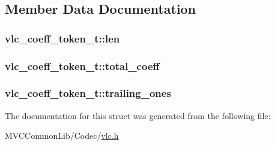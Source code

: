 \subsection{Member Data Documentation}
\hypertarget{structvlc__coeff__token__t_a44a0b097012b2c20f2c2da02dfe98e99}{
\subsubsection[{len}]{ {\bf vlc\_\-coeff\_\-token\_\-t::len}}}
\label{structvlc__coeff__token__t_a44a0b097012b2c20f2c2da02dfe98e99}
\hypertarget{structvlc__coeff__token__t_a8f1bc5c088694aeb2e4676a3d77abc71}{
\subsubsection[{total\_\-coeff}]{ {\bf vlc\_\-coeff\_\-token\_\-t::total\_\-coeff}}}
\label{structvlc__coeff__token__t_a8f1bc5c088694aeb2e4676a3d77abc71}
\hypertarget{structvlc__coeff__token__t_aa21454773dd262167cd9b110f1fe6b92}{
\subsubsection[{trailing\_\-ones}]{ {\bf vlc\_\-coeff\_\-token\_\-t::trailing\_\-ones}}}
\label{structvlc__coeff__token__t_aa21454773dd262167cd9b110f1fe6b92}


The documentation for this struct was generated from the following file:\begin{DoxyCompactItemize}
\item 
MVCCommonLib/Codec/\hyperlink{vlc_8h}{vlc.h}\end{DoxyCompactItemize}
